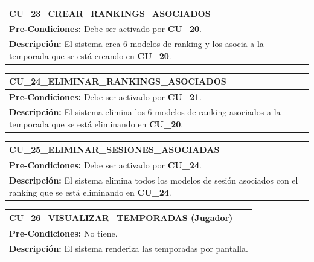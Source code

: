 \begin{center}
  \begin{tabular}{| p{7.5cm} | p{7.5cm} |}
    \hline
    \multicolumn{2}{|p{15cm}|}{\textbf{CU\_23\_CREAR\_RANKINGS\_ASOCIADOS}} \\ \hline
    \multicolumn{2}{|p{15cm}|}{\textbf{Pre-Condiciones:} Debe ser activado por \textbf{CU\_20}.} \\ \hline
    \multicolumn{2}{|p{15cm}|}{\textbf{Descripción:} El sistema crea 6 modelos de ranking y los asocia a la temporada que se está creando en \textbf{CU\_20}.} \\
    \hline
  \end{tabular}
\end{center}

\begin{center}
  \begin{tabular}{| p{7.5cm} | p{7.5cm} |}
    \hline
    \multicolumn{2}{|p{15cm}|}{\textbf{CU\_24\_ELIMINAR\_RANKINGS\_ASOCIADOS}} \\ \hline
    \multicolumn{2}{|p{15cm}|}{\textbf{Pre-Condiciones:} Debe ser activado por \textbf{CU\_21}.} \\ \hline
    \multicolumn{2}{|p{15cm}|}{\textbf{Descripción:} El sistema elimina los 6 modelos de ranking asociados a la temporada que se está eliminando en \textbf{CU\_20}.} \\
    \hline
  \end{tabular}
\end{center}

\begin{center}
  \begin{tabular}{| p{7.5cm} | p{7.5cm} |}
    \hline
    \multicolumn{2}{|p{15cm}|}{\textbf{CU\_25\_ELIMINAR\_SESIONES\_ASOCIADAS}} \\ \hline
    \multicolumn{2}{|p{15cm}|}{\textbf{Pre-Condiciones:} Debe ser activado por \textbf{CU\_24}.} \\ \hline
    \multicolumn{2}{|p{15cm}|}{\textbf{Descripción:} El sistema elimina todos los modelos de sesión asociados con el ranking que se está eliminando en \textbf{CU\_24}.} \\
    \hline
  \end{tabular}
\end{center}

\begin{center}
  \begin{tabular}{| p{7.5cm} | p{7.5cm} |}
    \hline
    \multicolumn{2}{|p{15cm}|}{\textbf{CU\_26\_VISUALIZAR\_TEMPORADAS} (Jugador)} \\ \hline
    \multicolumn{2}{|p{15cm}|}{\textbf{Pre-Condiciones:} No tiene.} \\ \hline
    \multicolumn{2}{|p{15cm}|}{\textbf{Descripción:} El sistema renderiza las temporadas por pantalla.} \\
    \hline
  \end{tabular}
\end{center}

